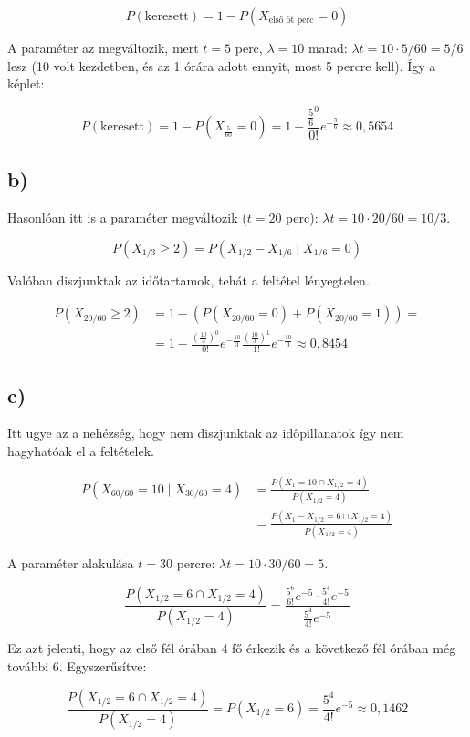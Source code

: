 \documentclass[a4paper,12pt]{article}
\begin{document}
\[P(\text{keresett}) = 1 - P(X_{\text{első öt perc}} = 0)\]

A paraméter az megváltozik, mert $t = 5$ perc, $\lambda = 10$ marad: 
$\lambda t = 10 \cdot 5/60 = 5/6$ lesz (10 volt kezdetben, 
és az 1 órára adott ennyit, most 5 percre kell). Így a képlet:

\[P(\text{keresett}) = 1 - P(X_\frac{5}{60} = 0) = 1 - \frac{\frac{5}{6}^0}{0!}
e^{-\frac{5}{6}} \approx 0,5654\]

\subsection*{b)}
Hasonlóan itt is a paraméter megváltozik ($t=20$ perc): 
$\lambda t = 10 \cdot 20/60 = 10/3$.

\[P(X_{1/3} \geq 2) = P(X_{1/2}-X_{1/6} \mid X_{1/6}=0)\]

Valóban diszjunktak az időtartamok, tehát a feltétel lényegtelen.

\[
\begin{split}
P(X_{20/60} \geq 2) &= 
1 - \left( P(X_{20/60} = 0) + P(X_{20/60} = 1)\right) = \\
&= 1 - \frac{\left(\frac{10}{3}\right)^0}{0!}e^{-\frac{10}{3}}
\frac{\left(\frac{10}{3}\right)^1}{1!}e^{-\frac{10}{3}}
\approx 0,8454
\end{split}
\]

\subsection*{c)}
Itt ugye az a nehézség, hogy nem diszjunktak az időpillanatok így nem
hagyhatóak el a feltételek.

\[
\begin{split}
P(X_{60/60} = 10 \mid X_{30/60} = 4) &= \frac{P(X_1 = 10 \cap X_{1/2} = 4)}
{P(X_{1/2} = 4)} \\
&= \frac{P(X_1-X_{1/2} = 6 \cap X_{1/2} = 4)}{P(X_{1/2} = 4)}
\end{split}
\]

A paraméter alakulása $t = 30$ percre: 
$\lambda t = 10 \cdot 30/60 = 5$.

\[
\frac{P(X_{1/2} = 6 \cap X_{1/2} = 4)}{P(X_{1/2} = 4)} = \frac{\frac{5^6}{6!}
e^{-5} \cdot \frac{5^4}{4!} e^{-5}}{\frac{5^4}{4!} e^{-5}}
\]

Ez azt jelenti, hogy az első fél órában 4 fő érkezik és a következő fél
órában még további 6. Egyszerűsítve:

\[
\frac{P(X_{1/2} = 6 \cap X_{1/2} = 4)}{P(X_{1/2} = 4)} = 
P(X_{1/2} = 6) =
\frac{5^4}{4!} e^{-5} \approx 0,1462
\]
\end{document}
